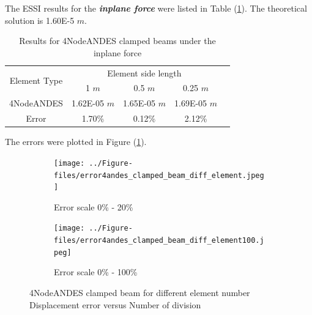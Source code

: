 \documentclass[fleqn,11pt]{article}
\begin{document}
The ESSI results for the \textbf{\emph{inplane force}} were listed in Table (\ref{table Results for 4NodeANDES clamped beams with more elements 2}). 
The theoretical solution is 1.60E-5 $m$. 

\begin{table}[H]
  \centering
      \caption{Results for 4NodeANDES clamped beams under the inplane force}
  \label{table Results for 4NodeANDES clamped beams with more elements 2}
  \begin{tabular}{|c|c|c|c|c|}
    \hline 
    \multirow{2}{*}{Element Type} 
       & \multicolumn{3}{|c|}{Element side length} \\ \cline{2-4}
       & 1 $m$ & 0.5 $m$ & 0.25 $m$ \\                              \hline
4NodeANDES  & 1.62E-05 $m$ & 1.65E-05 $m$ & 1.69E-05 $m$ \\ \hline
Error       & 1.70\%   & 0.12\%   & 2.12\%       \\         \hline
  \end{tabular}
\end{table}



The errors were plotted in Figure (\ref{fig error 4NodeANDES clamped beam for different element number}).

\begin{figure}[H]
  \begin{subfigure}{0.5\textwidth}
    \centering
    \texttt{[image: ../Figure-files/error4andes\_clamped\_beam\_diff\_element.jpeg]}
    \caption{Error scale 0\% - 20\%}
  \end{subfigure}
  \begin{subfigure}{0.5\textwidth}
    \centering
    \texttt{[image: ../Figure-files/error4andes\_clamped\_beam\_diff\_element100.jpeg]}
    \caption{Error scale 0\% - 100\%}
  \end{subfigure}
  \captionsetup{justification=centering,margin=2cm}
  \caption{4NodeANDES clamped beam for different element number\\
      Displacement error   versus   Number of division}
  \label{fig error 4NodeANDES clamped beam for different element number}
\end{figure}
\end{document}
